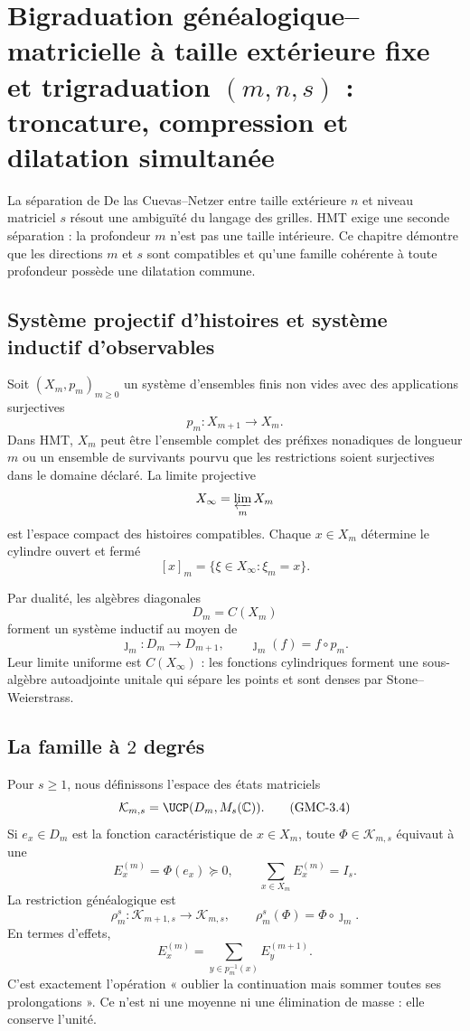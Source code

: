 \section[Bigraduation généalogique--matricielle]{Bigraduation
généalogique--matricielle à taille extérieure fixe et trigraduation
\texorpdfstring{$(m,n,s)$}{(m,n,s)} : troncature, compression et dilatation
simultanée}
\label{p12-83-c22-s4:gmc:chap:bigraduacion}

La séparation de De las Cuevas--Netzer entre taille extérieure $n$ et niveau
matriciel $s$ résout une ambiguïté du langage des grilles. HMT exige
une seconde séparation : la profondeur $m$ n'est pas une taille intérieure. Ce
chapitre démontre que les directions $m$ et $s$ sont compatibles et qu'une
famille cohérente à toute profondeur possède une dilatation commune.

\subsection{Système projectif d'histoires et système inductif d'observables}

Soit $(X_m,p_m)_{m\ge0}$ un système d'ensembles finis non vides avec des applications
surjectives
\[
 p_m:X_{m+1}\longrightarrow X_m.
 \tag{GMC-3.1}
\]
Dans HMT, $X_m$ peut être l'ensemble complet des préfixes nonadiques de
longueur $m$ ou un ensemble de survivants pourvu que les restrictions
soient surjectives dans le domaine déclaré. La limite projective
\[
 X_\infty=\varprojlim_m X_m
\]
est l'espace compact des histoires compatibles. Chaque $x\in X_m$ détermine
le cylindre ouvert et fermé
\[
 [x]_m=\{\xi\in X_\infty:\xi_m=x\}.
 \tag{GMC-3.2}
\]

Par dualité, les algèbres diagonales
\[
 D_m=C(X_m)
\]
forment un système inductif au moyen de
\[
 \jmath_m:D_m\longrightarrow D_{m+1},
 \qquad \jmath_m(f)=f\circ p_m.
 \tag{GMC-3.3}
\]
Leur limite uniforme est $C(X_\infty)$ : les fonctions cylindriques forment une
sous-algèbre autoadjointe unitale qui sépare les points et sont denses par
Stone--Weierstrass.

\subsection{La famille à \(2\) degrés}

Pour $s\ge1$, nous définissons l'espace des états matriciels
\[
 \mathcal K_{m,s}=\UCP(D_m,M_s(\mathbb C)).
 \tag{GMC-3.4}
\]
Si $e_x\in D_m$ est la fonction caractéristique de $x\in X_m$, toute
$\Phi\in\mathcal K_{m,s}$ équivaut à une \POVM
\[
 E_x^{(m)}=\Phi(e_x)\succeq0,
 \qquad
 \sum_{x\in X_m}E_x^{(m)}=I_s.
 \tag{GMC-3.5}
\]
La restriction généalogique est
\[
 \rho_m^s:\mathcal K_{m+1,s}\longrightarrow\mathcal K_{m,s},
 \qquad
 \rho_m^s(\Phi)=\Phi\circ\jmath_m.
 \tag{GMC-3.6}
\]
En termes d'effets,
\[
 E_x^{(m)}=\sum_{y\in p_m^{-1}(x)}E_y^{(m+1)}.
 \tag{GMC-3.7}
\]
C'est exactement l'opération « oublier la continuation mais sommer toutes ses
prolongations ». Ce n'est ni une moyenne ni une élimination de masse : elle conserve l'unité.

